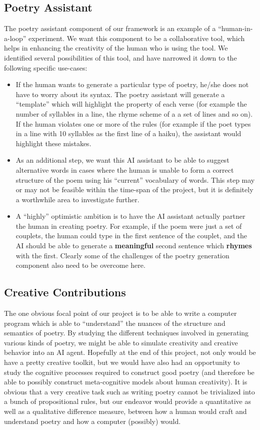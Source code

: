 \documentclass[10pt, letter,twocolumn]{IEEEtran}
\begin{document}
\subsection*{Poetry Assistant}
The poetry assistant component of our framework is an example of a ``human-in-a-loop'' experiment. We want this component to be a collaborative tool, which helps in enhancing the creativity of the human who is using the tool. We identified several possibilities of this tool, and have narrowed it down to the following specific use-cases:
\begin{itemize}
	\item If the human wants to generate a particular type of poetry, he/she does not have to worry about its syntax. The poetry assistant will generate a ``template'' which will highlight the property of each verse (for example the number of syllables in a line, the rhyme scheme of a a set of lines and so on). If the human violates one or more of the rules (for example if the poet types in a line with 10 syllables as the first line of a haiku), the assistant would highlight these mistakes.
	\item As an additional step, we want this AI assistant to be able to suggest alternative words in cases where the human is unable to form a correct structure of the poem using his ``current'' vocabulary of words. This step may or may not be feasible within the time-span of the project, but it is definitely a worthwhile area to investigate further.
	\item A ``highly'' optimistic ambition is to have the AI assistant actually partner the human in creating poetry. For example, if the poem were just a set of couplets, the human could type in the first sentence of the couplet, and the AI should be able to generate a \textbf{meaningful} second sentence which \textbf{rhymes} with the first. Clearly some of the challenges of the poetry generation component also need to be overcome here.
\end{itemize}

\subsection*{Creative Contributions}

The one obvious focal point of our project is to be able to write a computer program which is able to ``understand'' the nuances of the structure and semantics of poetry. By studying the different techniques involved in generating various kinds of poetry, we might be able to simulate creativity and creative behavior into an AI agent. Hopefully at the end of this project, not only would be have a pretty creative toolkit, but we would have also had an opportunity to study the cognitive processes required to construct good poetry (and therefore be able to possibly construct meta-cognitive models about human creativity). It is obvious that a very creative task such as writing poetry cannot be trivialized into a bunch of propositional rules, but our endeavor would provide a quantitative as well as a qualitative difference measure, between how a human would craft and understand poetry and how a computer (possibly) would.
\end{document}
